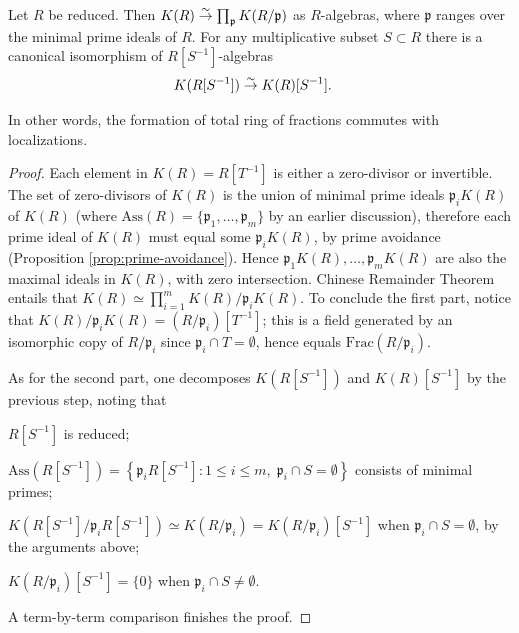 \begin{lemma}\label{prop:K-vs-localization}
	Let $R$ be reduced. Then $K(R) \stackrel{\sim}{\rightarrow} \prod_{\mathfrak{p}} K(R/\mathfrak{p})$ as $R$-algebras, where $\mathfrak{p}$ ranges over the minimal prime ideals of $R$. For any multiplicative subset $S \subset R$ there is a canonical isomorphism of $R[S^{-1}]$-algebras
	\begin{align*}
	K(R[S^{-1}]) & \stackrel{\sim}{\rightarrow} K(R)[S^{-1}].
	\end{align*}
\end{lemma}
In other words, the formation of total ring of fractions commutes with localizations.
\begin{proof}
	Each element in $K(R) = R[T^{-1}]$ is either a zero-divisor or invertible. The set of zero-divisors of $K(R)$ is the union of minimal prime ideals $\mathfrak{p}_i K(R)$ of $K(R)$ (where $\text{Ass}(R) = \{ \mathfrak{p}_1, \ldots, \mathfrak{p}_m\}$ by an earlier discussion), therefore each prime ideal of $K(R)$ must equal some $\mathfrak{p}_i K(R)$, by prime avoidance (Proposition \ref{prop:prime-avoidance}). Hence $\mathfrak{p}_1 K(R), \ldots, \mathfrak{p}_m K(R)$ are also the maximal ideals in $K(R)$, with zero intersection. Chinese Remainder Theorem entails that $K(R) \simeq \prod_{i=1}^m K(R)/\mathfrak{p}_i K(R)$. To conclude the first part, notice that $K(R)/\mathfrak{p}_i K(R) = (R/\mathfrak{p}_i)[T^{-1}]$; this is a field generated by an isomorphic copy of $R/\mathfrak{p}_i$ since $\mathfrak{p}_i \cap T = \emptyset$, hence equals $\text{Frac}(R/\mathfrak{p}_i)$.
	
	As for the second part, one decomposes $K(R[S^{-1}])$ and $K(R)[S^{-1}]$ by the previous step, noting that
	\begin{compactitem}
		\item $R[S^{-1}]$ is reduced;
		\item $\text{Ass}(R[S^{-1}]) = \left\{ \mathfrak{p}_i R[S^{-1}]: 1 \leq i \leq m, \; \mathfrak{p}_i \cap S = \emptyset \right\}$ consists of minimal primes;
		\item $K\left( R[S^{-1}] \big/ \mathfrak{p}_i R[S^{-1}]\right) \simeq K(R/\mathfrak{p}_i) = K(R/\mathfrak{p}_i)[S^{-1}]$ when $\mathfrak{p}_i \cap S = \emptyset$, by the arguments above;
		\item $K(R/\mathfrak{p}_i)[S^{-1}] = \{0\}$ when $\mathfrak{p}_i \cap S \neq \emptyset$.
	\end{compactitem}
	A term-by-term comparison finishes the proof.
\end{proof}

